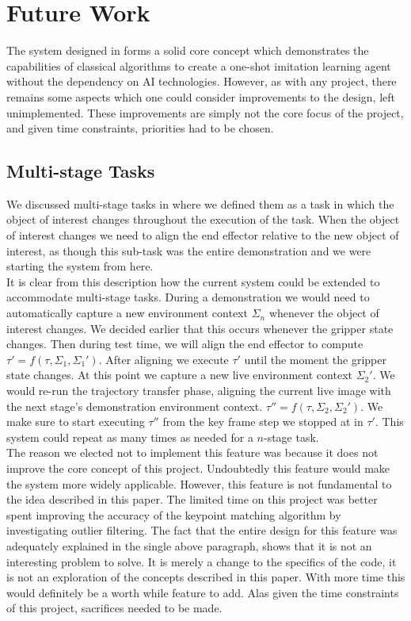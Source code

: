 \chapter{Future Work}
\label{chap:future}

The system designed in  forms a solid core concept which demonstrates the capabilities of classical algorithms to create a one-shot imitation learning agent without the dependency on AI technologies. However, as with any project, there remains some aspects which one could consider improvements to the design, left unimplemented. These improvements are simply not the core focus of the project, and given time constraints, priorities had to be chosen.

\section{Multi-stage Tasks}
We discussed multi-stage tasks in  where we defined them as a task in which the object of interest changes throughout the execution of the task. When the object of interest changes we need to align the end effector relative to the new object of interest, as though this sub-task was the entire demonstration and we were starting the system from here.\\

It is clear from this description how the current system could be extended to accommodate multi-stage tasks. During a demonstration we would need to automatically capture a new environment context $\Sigma_n$ whenever the object of interest changes. We decided earlier that this occurs whenever the gripper state changes. Then during test time, we will align the end effector to compute $\tau' = f(\tau, \Sigma_1, \Sigma_1')$. After aligning we execute $\tau'$ until the moment the gripper state changes. At this point we capture a new live environment context $\Sigma_2'$. We would re-run the trajectory transfer phase, aligning the current live image with the next stage's demonstration environment context. $\tau'' = f(\tau, \Sigma_2, \Sigma_2')$. We make sure to start executing $\tau''$ from the key frame step we stopped at in $\tau'$. This system could repeat as many times as needed for a $n$-stage task.\\

The reason we elected not to implement this feature was because it does not improve the core concept of this project. Undoubtedly this feature would make the system more widely applicable. However, this feature is not fundamental to the idea described in this paper. The limited time on this project was better spent improving the accuracy of the keypoint matching algorithm by investigating outlier filtering. The fact that the entire design for this feature was adequately explained in the single above paragraph, shows that it is not an interesting problem to solve. It is merely a change to the specifics of the code, it is not an exploration of the concepts described in this paper. With more time this would definitely be a worth while feature to add. Alas given the time constraints of this project, sacrifices needed to be made.

